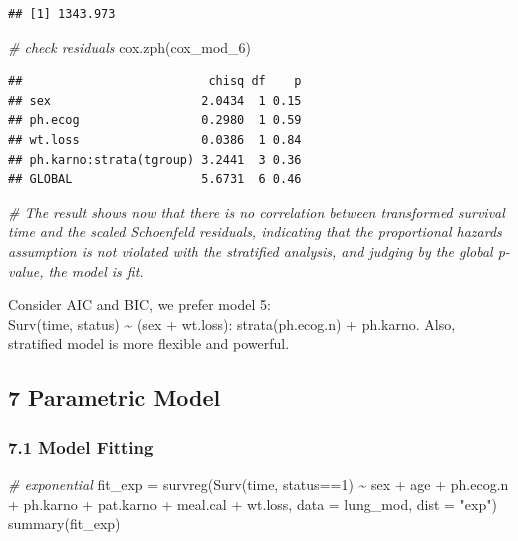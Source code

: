 \documentclass[
]{article}
\newenvironment{Shaded}{\begin{snugshade}}{\end{snugshade}}
\newcommand{\AttributeTok}[1]{\textcolor[rgb]{0.77,0.63,0.00}{#1}}
\newcommand{\CommentTok}[1]{\textcolor[rgb]{0.56,0.35,0.01}{\textit{#1}}}
\newcommand{\DecValTok}[1]{\textcolor[rgb]{0.00,0.00,0.81}{#1}}
\newcommand{\FunctionTok}[1]{\textcolor[rgb]{0.00,0.00,0.00}{#1}}
\newcommand{\NormalTok}[1]{#1}
\newcommand{\OtherTok}[1]{\textcolor[rgb]{0.56,0.35,0.01}{#1}}
\newcommand{\SpecialCharTok}[1]{\textcolor[rgb]{0.00,0.00,0.00}{#1}}
\newcommand{\StringTok}[1]{\textcolor[rgb]{0.31,0.60,0.02}{#1}}
\begin{document}
\begin{verbatim}
## [1] 1343.973
\end{verbatim}

\begin{Shaded}
\begin{Highlighting}[]
\CommentTok{\# check residuals}
\FunctionTok{cox.zph}\NormalTok{(cox\_mod\_6)}
\end{Highlighting}
\end{Shaded}

\begin{verbatim}
##                          chisq df    p
## sex                     2.0434  1 0.15
## ph.ecog                 0.2980  1 0.59
## wt.loss                 0.0386  1 0.84
## ph.karno:strata(tgroup) 3.2441  3 0.36
## GLOBAL                  5.6731  6 0.46
\end{verbatim}

\begin{Shaded}
\begin{Highlighting}[]
\CommentTok{\# The result shows now that there is no correlation between transformed survival time and the scaled Schoenfeld residuals, indicating that the proportional hazards assumption is not violated with the stratified analysis, and judging by the global p{-}value, the model is fit.}
\end{Highlighting}
\end{Shaded}

Consider AIC and BIC, we prefer model 5:\\
Surv(time, status) \textasciitilde{} (sex + wt.loss): strata(ph.ecog.n)
+ ph.karno. Also, stratified model is more flexible and powerful.

\hypertarget{parametric-model}{%
\subsection{7 Parametric Model}\label{parametric-model}}

\hypertarget{model-fitting}{%
\subsubsection{7.1 Model Fitting}\label{model-fitting}}

\begin{Shaded}
\begin{Highlighting}[]
\CommentTok{\# exponential}
\NormalTok{fit\_exp }\OtherTok{=} \FunctionTok{survreg}\NormalTok{(}\FunctionTok{Surv}\NormalTok{(time, status}\SpecialCharTok{==}\DecValTok{1}\NormalTok{) }\SpecialCharTok{\textasciitilde{}}\NormalTok{ sex }\SpecialCharTok{+}\NormalTok{ age }\SpecialCharTok{+}\NormalTok{ ph.ecog.n }\SpecialCharTok{+}\NormalTok{ ph.karno }\SpecialCharTok{+}\NormalTok{ pat.karno }\SpecialCharTok{+}\NormalTok{ meal.cal }\SpecialCharTok{+}\NormalTok{ wt.loss,}
                  \AttributeTok{data =}\NormalTok{ lung\_mod, }\AttributeTok{dist =} \StringTok{"exp"}\NormalTok{)}
\FunctionTok{summary}\NormalTok{(fit\_exp)}
\end{Highlighting}
\end{Shaded}
\end{document}

